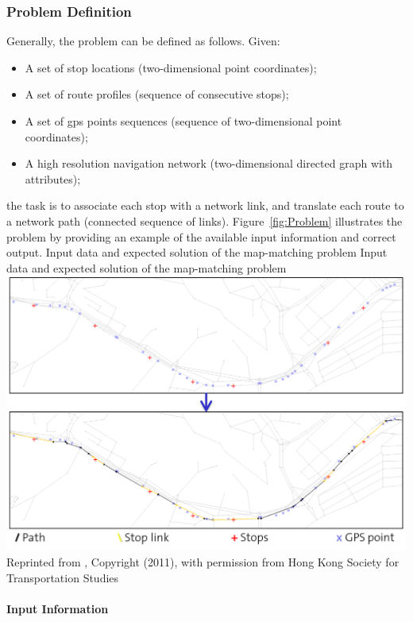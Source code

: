 \subsubsection{Problem Definition}
Generally, the problem can be defined as follows. Given:
%
\begin{itemize}\styleItemize
\item A set of stop locations (two-dimensional point coordinates);
\item A set of route profiles (sequence of consecutive stops);
\item A set of \gls{gps} points sequences (sequence of two-dimensional point coordinates);
\item A high resolution navigation network (two-dimensional directed graph with attributes);
\end{itemize}
%
the task is to associate each stop with a network link, and translate each route to a network path (connected sequence of links). Figure~\ref{fig:Problem} illustrates the problem by providing an example of the available input information and correct output.
%
\createfigure
{Input data and expected solution of the map-matching problem}
{Input data and expected solution of the map-matching problem}
{\label{fig:Problem}}
{\includegraphics[width=1.0\textwidth]{extending/figures/semiAuto/Problem.png}}
{Reprinted from \citet[][p.753]{Ordonez_HKSTS_2011}, Copyright (2011), with permission from Hong Kong Society for Transportation Studies}

\paragraph{Input Information}

